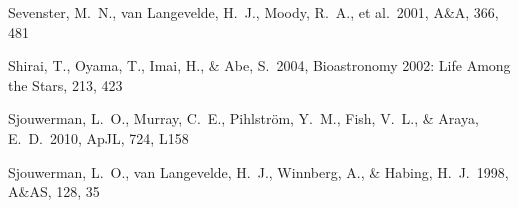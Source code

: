 \begin{thebibliography}{99}
\begin{multicols}{2}
{%










Sevenster, M.~N., van Langevelde, H.~J., Moody, R.~A., et al.\ 2001, A\&A, 366, 481 

 Shirai, T., Oyama, T., Imai, H., 
\& Abe, S.\ 2004, Bioastronomy 2002: Life Among the Stars, 213, 423 


Sjouwerman, L.~O., Murray, C.~E., Pihlstr{\"o}m, Y.~M., Fish, V.~L., \& Araya, E.~D.\ 2010, ApJL, 724, L158 

Sjouwerman, L.~O., van Langevelde, H.~J., Winnberg, A., \& Habing, H.~J.\ 1998, A\&AS, 128, 35

}
\end{multicols}
\end{thebibliography}
